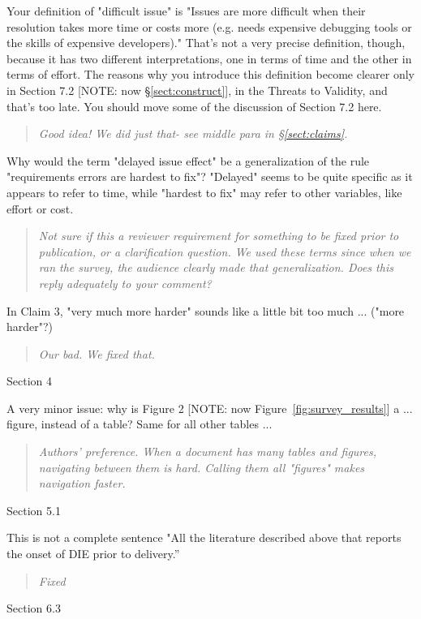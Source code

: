 \documentclass[smallcondensed]{svjour3}
\newcommand{\tion}[1]{\S\ref{sect:#1}}
\newcommand{\fig}[1]{Figure~\ref{fig:#1}}
\begin{document}
 
Your definition of "difficult issue" is "Issues are more
difficult when their resolution takes more time or costs
more (e.g. needs expensive debugging tools or the skills of
expensive developers)." That's not a very precise
definition, though, because it has two different
interpretations, one in terms of time and the other in terms
of effort. The reasons why you introduce this definition
become clearer only in Section 7.2 [NOTE: now \tion{construct}], in the Threats to
Validity, and that's too late. You should move some of the
discussion of Section 7.2 here.
\begin{quote}
{\em Good idea! We did just that- see middle para in \tion{claims}.}
\end{quote}
Why would the term "delayed issue effect" be a
generalization of the rule "requirements errors are hardest
to fix"? "Delayed" seems to be quite specific as it appears
to refer to time, while "hardest to fix" may refer to other
variables, like effort or cost.
\begin{quote}
{\em Not sure if this a reviewer requirement for something to be fixed
prior to publication, or a clarification question. We used these
terms since when we ran the survey, the audience clearly made
that generalization. Does this reply adequately to your comment?}
\end{quote}
In Claim 3, "very much more harder" sounds like a
little bit too much ... ("more harder"?)
\begin{quote}
{\em Our bad. We fixed that.}
\end{quote}
Section 4

A very minor issue: why is Figure 2 [NOTE: now \fig{survey_results}] a ... figure, instead of
a table? Same for all other tables ...
\begin{quote}
{\em Authors' preference. When a document has many tables and figures, navigating
between them is hard. Calling them all "figures" makes navigation faster. }
\end{quote}
Section 5.1

This is not a complete sentence "All the literature
described above that reports the onset of DIE prior to delivery.''

\begin{quote}
{\em Fixed}
\end{quote}

Section 6.3
\end{document}
